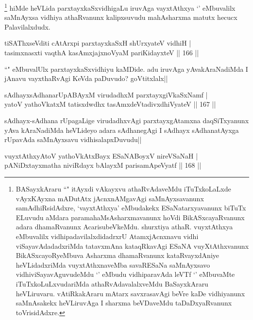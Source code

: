 \begin{artha}
\footnote[1]{BASayxkAraru ``\stext" itAyxdi vAkayxvu athaRvAdaveMdu iTuTxkoLaLxde vAyxKAyxna mADutAtx jAcnxnAMgavAgi saMnAyxsavanunx samAdhiRsidAdxre, `vayxtAthxya' eMbudakekx ESaNatarxyavanunx biTuTx ELuvudu aMdara paramahaMsAsharxmavanunx hoVdi BikASxcayaRvanunx adara dhamaRvanunx AcarisubeVkeMdu. shurxtiya athaR. vuyxtAthxya eMbuvalilx vidhipadavilalxdidadrxrU AtamxjAcnxnavu vidhi viSayavAdadadxriMda tatavxmAna kataqRkavAgi ESaNA vuyXtAthxvanunx BikASxcayoRyeMbuva Asharxma dhamaRvanunx kataRvayxdAniye heVLidadxriMda vuyxtAthxnaveMba savaRESaNa saMnAyxsavo vidhiviSayavAguvudeMdu `\stext' eMbudu vidhiparavAda leVTf `\stext ' eMbuvaMte iTuTxkoLuLxvudariMda athaRvAdavalalxveMdu BaSayxkAraru heVLiruvaru. vAtiRkakAraru mAtarx savxrasavAgi beVre kaDe vidhiyanunx saMnAsakekx heVLiruvAga I sharxma beVDaveMdu taDaDxyaRvanunx toVrisidAdxre.} hiMde heVLida parxtayxkaSxvidhigaLu iruvAga vayxtAthxya  `\stext ' eMbuvalilx saMnAyxsa vidhiya athaRvanunx kalipxsuvudu mahAsharxma matutx hecucx Palavilalxdudx.
\end{artha}

\begin{shl}
tiSAThxseVditi cAtArxpi parxtayxkaSxH shUrxyateV vidhiH |\\
tasimxnasxti vaqthA kasAmxjajxnoV\s yaM pariKidayxteV \hfill || 166 ||
\end{shl}

\begin{artha}
``\stext " eMbuvalUlx parxtayxkaSxvidhiyu kaMDide. adu iruvAga yAvakAraNadiMda I jAnavu vayxthaRvAgi KeVda paDuvudo? goVtitxlalx||
\end{artha}

\begin{shl}
sAdhayxsAdhanarUpABAyxM virudadhxM parxtayxgiVkaSxNamf |\\
yatoV yathoVkatxM tatisxdwdhx tasAmxdeVtadivxdhiVyateV \hfill || 167 ||
\end{shl}

\begin{artha}%
sAdhayx-sAdhana rUpagaLige virudadhxvAgi parxtayxgAtamxna daqSiTxyanunx yAva kAraNadiMda heVLideyo adara sAdhanegAgi I sAdhayx sAdhanatAyxga rUpavAda saMnAyxsavu vidhisalapxDuvudu||
\end{artha}

\begin{shl}
vuyxtAthxyAtoV yathoVkAtxBayx ESaNABoyxV nireVSaNaH |\\
pANiDxtayxmatha niviRdayx bAlayxM parisamApeVyatf \hfill || 168 ||
\end{shl}

